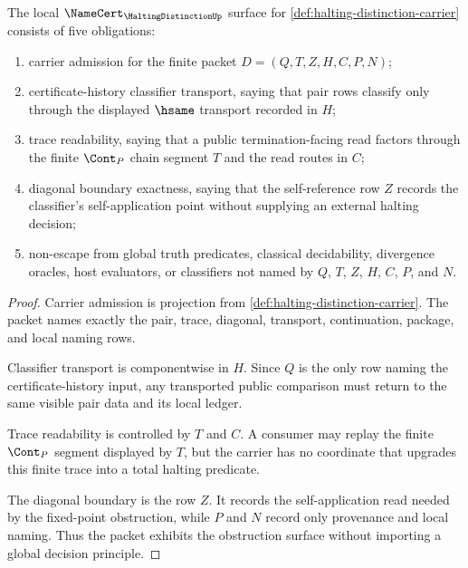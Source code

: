 \begin{theorem}
\label{thm:halting-distinction-namecert-obligations}
The local $\NameCert_{\HaltingDistinctionUp}$ surface for \autoref{def:halting-distinction-carrier} consists of five obligations:
\begin{enumerate}
\item carrier admission for the finite packet $D=(Q,T,Z,H,C,P,N)$;
\item certificate-history classifier transport, saying that pair rows classify only through the displayed $\hsame$ transport recorded in $H$;
\item trace readability, saying that a public termination-facing read factors through the finite $\Cont_P$ chain segment $T$ and the read routes in $C$;
\item diagonal boundary exactness, saying that the self-reference row $Z$ records the classifier's self-application point without supplying an external halting decision;
\item non-escape from global truth predicates, classical decidability, divergence oracles, host evaluators, or classifiers not named by $Q$, $T$, $Z$, $H$, $C$, $P$, and $N$.
\end{enumerate}
\end{theorem}
\begin{proof}
Carrier admission is projection from \autoref{def:halting-distinction-carrier}. The packet names exactly the pair, trace, diagonal, transport, continuation, package, and local naming rows.

Classifier transport is componentwise in $H$. Since $Q$ is the only row naming the certificate-history input, any transported public comparison must return to the same visible pair data and its local ledger.

Trace readability is controlled by $T$ and $C$. A consumer may replay the finite $\Cont_P$ segment displayed by $T$, but the carrier has no coordinate that upgrades this finite trace into a total halting predicate.

The diagonal boundary is the row $Z$. It records the self-application read needed by the fixed-point obstruction, while $P$ and $N$ record only provenance and local naming. Thus the packet exhibits the obstruction surface without importing a global decision principle.
\end{proof}

